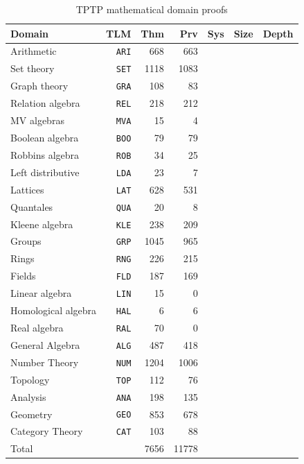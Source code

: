 \documentclass[runningheads]{llncs}
\begin{document}
\begin{table}[htb]
\begin{center}
\setlength{\tabcolsep}{4pt}
\begin{tabular}{lr|rrrrr}
Domain              & TLM       & Thm  & Prv  & Sys & Size & Depth \\
\hline
Arithmetic          & {\tt ARI} &  668 &  663 &     &      &       \\
Set theory          & {\tt SET} & 1118 & 1083 &     &      &       \\
Graph theory        & {\tt GRA} &  108 &   83 &     &      &       \\
Relation algebra    & {\tt REL} &  218 &  212 &     &      &       \\
MV algebras         & {\tt MVA} &   15 &    4 &     &      &       \\
Boolean algebra     & {\tt BOO} &   79 &   79 &     &      &       \\
Robbins algebra     & {\tt ROB} &   34 &   25 &     &      &       \\
Left distributive   & {\tt LDA} &   23 &    7 &     &      &       \\
Lattices            & {\tt LAT} &  628 &  531 &     &      &       \\
Quantales           & {\tt QUA} &   20 &    8 &     &      &       \\
Kleene algebra      & {\tt KLE} &  238 &  209 &     &      &       \\
Groups              & {\tt GRP} & 1045 &  965 &     &      &       \\
Rings               & {\tt RNG} &  226 &  215 &     &      &       \\
Fields              & {\tt FLD} &  187 &  169 &     &      &       \\
Linear algebra      & {\tt LIN} &   15 &    0 &     &      &       \\
Homological algebra & {\tt HAL} &    6 &    6 &     &      &       \\
Real algebra        & {\tt RAL} &   70 &    0 &     &      &       \\
General Algebra     & {\tt ALG} &  487 &  418 &     &      &       \\
Number Theory       & {\tt NUM} & 1204 & 1006 &     &      &       \\
Topology            & {\tt TOP} &  112 &   76 &     &      &       \\
Analysis            & {\tt ANA} &  198 &  135 &     &      &       \\
Geometry            & {\tt GEO} &  853 &  678 &     &      &       \\
Category Theory     & {\tt CAT} &  103 &   88 &     &      &       \\
\hline
Total               &           & 7656 &11778 &     &      &       \\
\end{tabular}
\end{center}
\caption{TPTP mathematical domain proofs}
\label{Proofs}
\end{table}
\end{document}

